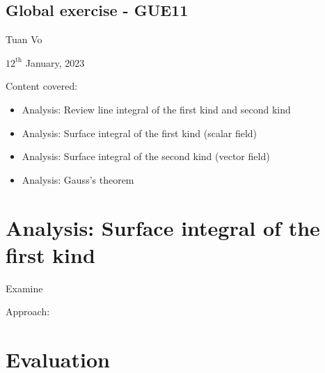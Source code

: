 \documentclass[12pt]{article}
\begin{document}
\begin{center}
	\section*{Global exercise - GUE11}
\end{center}
\begin{center}
	Tuan Vo
\end{center}
\begin{center}
	$12^{\text{th}}$ January, 2023
\end{center}
Content covered:
\begin{itemize}
	\item[\checkmark] Analysis: Review line integral of the first kind and second kind 
	\item[\checkmark] Analysis: Surface integral of the first kind (scalar field)
	\item[\checkmark] Analysis: Surface integral of the second kind (vector field)
	\item[\checkmark] Analysis: Gauss's theorem
\end{itemize}
\section{Analysis: Surface integral of the first kind}
\begin{exampleboxed}
	Examine
\end{exampleboxed}
Approach:
\clearpage
\section{Evaluation}


% 
\end{document}
